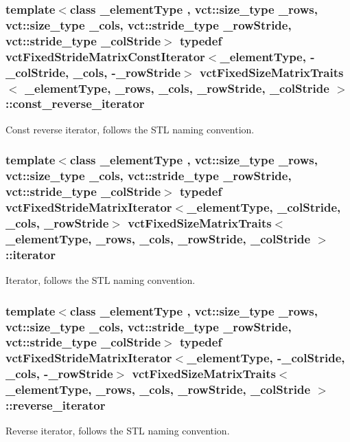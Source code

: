 \subsubsection[{const\+\_\+reverse\+\_\+iterator}]{\setlength{\rightskip}{0pt plus 5cm}template$<$class \+\_\+element\+Type , vct\+::size\+\_\+type \+\_\+rows, vct\+::size\+\_\+type \+\_\+cols, vct\+::stride\+\_\+type \+\_\+row\+Stride, vct\+::stride\+\_\+type \+\_\+col\+Stride$>$ typedef {\bf vct\+Fixed\+Stride\+Matrix\+Const\+Iterator}$<$\+\_\+element\+Type, -\/\+\_\+col\+Stride, \+\_\+cols, -\/\+\_\+row\+Stride$>$ {\bf vct\+Fixed\+Size\+Matrix\+Traits}$<$ \+\_\+element\+Type, \+\_\+rows, \+\_\+cols, \+\_\+row\+Stride, \+\_\+col\+Stride $>$\+::{\bf const\+\_\+reverse\+\_\+iterator}}\label{classvct_fixed_size_matrix_traits_a362cff0931f811552609307e80af3eab}
Const reverse iterator, follows the S\+T\+L naming convention. \hypertarget{classvct_fixed_size_matrix_traits_a677065481ada218e2559cdec92e97fd8}{}
\subsubsection[{iterator}]{\setlength{\rightskip}{0pt plus 5cm}template$<$class \+\_\+element\+Type , vct\+::size\+\_\+type \+\_\+rows, vct\+::size\+\_\+type \+\_\+cols, vct\+::stride\+\_\+type \+\_\+row\+Stride, vct\+::stride\+\_\+type \+\_\+col\+Stride$>$ typedef {\bf vct\+Fixed\+Stride\+Matrix\+Iterator}$<$\+\_\+element\+Type, \+\_\+col\+Stride, \+\_\+cols, \+\_\+row\+Stride$>$ {\bf vct\+Fixed\+Size\+Matrix\+Traits}$<$ \+\_\+element\+Type, \+\_\+rows, \+\_\+cols, \+\_\+row\+Stride, \+\_\+col\+Stride $>$\+::{\bf iterator}}\label{classvct_fixed_size_matrix_traits_a677065481ada218e2559cdec92e97fd8}
Iterator, follows the S\+T\+L naming convention. \hypertarget{classvct_fixed_size_matrix_traits_aa132098455575ae9bc4962c994273baa}{}
\subsubsection[{reverse\+\_\+iterator}]{\setlength{\rightskip}{0pt plus 5cm}template$<$class \+\_\+element\+Type , vct\+::size\+\_\+type \+\_\+rows, vct\+::size\+\_\+type \+\_\+cols, vct\+::stride\+\_\+type \+\_\+row\+Stride, vct\+::stride\+\_\+type \+\_\+col\+Stride$>$ typedef {\bf vct\+Fixed\+Stride\+Matrix\+Iterator}$<$\+\_\+element\+Type, -\/\+\_\+col\+Stride, \+\_\+cols, -\/\+\_\+row\+Stride$>$ {\bf vct\+Fixed\+Size\+Matrix\+Traits}$<$ \+\_\+element\+Type, \+\_\+rows, \+\_\+cols, \+\_\+row\+Stride, \+\_\+col\+Stride $>$\+::{\bf reverse\+\_\+iterator}}\label{classvct_fixed_size_matrix_traits_aa132098455575ae9bc4962c994273baa}
Reverse iterator, follows the S\+T\+L naming convention. 

